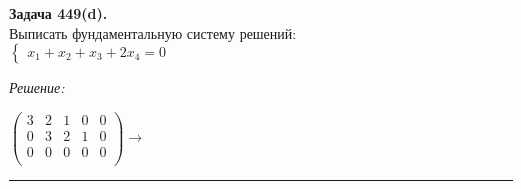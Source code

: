 \documentclass[a4paper, 12pt]{article}
\newenvironment{problem}[2][Задача]
    { \begin{mdframed}[backgroundcolor=gray!10] \textbf{#1 #2.} \\}
    {  \end{mdframed}}
\newenvironment{solution}
    {\textit{Решение: }}
    {\noindent\rule{7in}{1.5pt}}
\begin{document}
\begin{problem}{449(d)}
Выписать фундаментальную систему решений:\\
$\left\{\begin{array}{l}
x_1+x_2+x_3+2x_4=0
\end{array}\right.$

\end{problem}
\begin{solution}

$
\left(
\begin{array}{rrrrrrrr}
3 & 2 & 1 & 0 & 0\\
0 & 3 & 2 & 1 & 0\\
0 & 0 & 0 & 0 & 0\\
\end{array}
\right)
\rightarrow
$

\end{solution}

\end{document}
